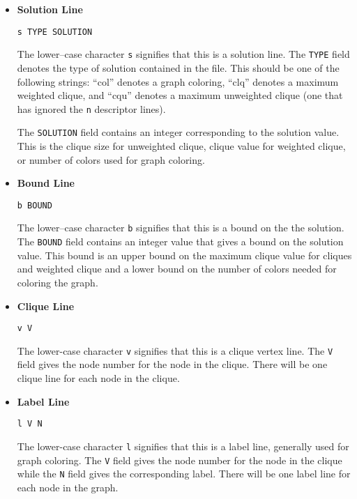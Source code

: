 \begin{itemize}

\item {\bf Solution Line}

\begin{verbatim}
s TYPE SOLUTION
\end{verbatim}
The lower--case character {\tt s} signifies that this is a solution 
line. The {\tt TYPE} field denotes the type of solution contained in
the file.  This should be one of the following strings: ``col''
denotes a graph coloring, ``clq'' denotes a maximum weighted clique,
and ``cqu'' denotes a maximum unweighted clique (one that has ignored
the {\tt n} descriptor lines).

The {\tt SOLUTION} field contains an integer corresponding
to the solution value.  This is the clique size for unweighted clique,
clique value for weighted clique, or number of colors used for graph
coloring.

\item {\bf Bound Line}
\begin{verbatim}
b BOUND
\end{verbatim}

The lower--case character {\tt b} signifies that this is a bound on
the the solution.  The {\tt BOUND} field contains an integer value
that gives a bound on the solution value.  This bound is an upper
bound on the maximum clique value for cliques and weighted clique and
a lower bound on the number of colors needed for coloring the graph.

\item{\bf Clique Line}
\begin{verbatim}
v V
\end{verbatim}

The lower-case character {\tt v} signifies that this is a clique vertex
line.  The {\tt V} field gives the node number for the node in the
clique.  There will be one clique line for each node in the clique.

\item{\bf Label Line}
\begin{verbatim}
l V N
\end{verbatim}

The lower-case character {\tt l} signifies that this is a label 
line, generally used for graph coloring.  The {\tt V} field gives the node number for the node in the
clique while the {\tt N} field gives the corresponding label.  There will be one label line for each node in the graph.


\end{itemize}



